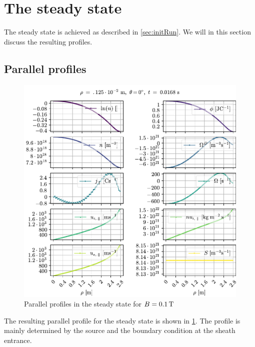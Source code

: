 \section{The steady state}
%
The steady state is achieved as described in \cref{sec:initRun}.
We will in this section discuss the resulting profiles.

\subsection{Parallel profiles}
%
\begin{figure}[htb]
    \centering
    \includegraphics[width=1.0\textwidth]{fig/results/1DProfiles/B010Par}
    \caption{Parallel profiles in the steady state for $B=0.1\, \text{T}$}
    \label{fig:parProfs}
\end{figure}
%
The resulting parallel profile for the steady state is shown in \cref{fig:parProfs}.
The profile is mainly determined by the source and the boundary condition at the sheath entrance.

